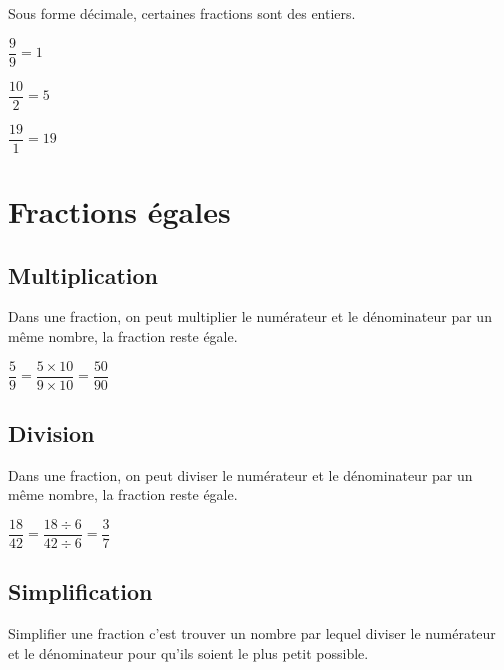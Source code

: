\documentclass[11pt]{article}
\begin{document}
\begin{remarque}
Sous forme décimale, certaines fractions sont des entiers.
\end{remarque}

\begin{exemple}
  \begin{enu}
  \item $\dfrac{9}{9}=1$
  \item $\dfrac{10}{2}=5$
  \item $\dfrac{19}{1}=19$
  \end{enu}
\end{exemple}

\section{Fractions égales}

\subsection{Multiplication}
\begin{propriete}
Dans une fraction, on peut multiplier le numérateur et
le dénominateur par un même nombre, la fraction reste égale.
\end{propriete}

\begin{exemple}
$\dfrac{5}{9}=\dfrac{5 \times 10}{9 \times 10}=\dfrac{50}{90}$
\end{exemple}

\subsection{Division}
\begin{propriete}
Dans une fraction, on peut diviser le numérateur et
le dénominateur par un même nombre, la fraction reste égale.
\end{propriete}

\begin{exemple}
$\dfrac{18}{42}=\dfrac{18 \div 6}{42 \div 6}=\dfrac{3}{7}$
\end{exemple}

\subsection{Simplification}
\begin{definition}
Simplifier une fraction c'est trouver un nombre par lequel diviser le
numérateur et le dénominateur pour qu'ils soient le plus petit possible.
\end{definition}
\end{document}
